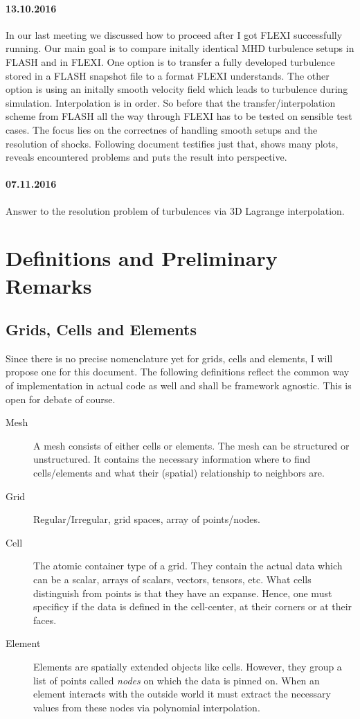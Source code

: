 \paragraph{13.10.2016}
In our last meeting we discussed how to proceed after I got FLEXI successfully
running. Our main goal is to compare initally identical MHD turbulence setups
in FLASH and in FLEXI. One option is to transfer a fully developed turbulence
stored in a FLASH snapshot file to a format FLEXI understands. The other option
is using an initally smooth velocity field which leads to turbulence during
simulation. Interpolation is in order. So before that the
transfer/interpolation scheme from FLASH all the way through FLEXI has to be
tested on sensible test cases. The focus lies on the correctnes of handling
smooth setups and the resolution of shocks. Following document testifies just
that, shows many plots, reveals encountered problems and puts the result into
perspective.

\paragraph{07.11.2016}
Answer to the resolution problem of turbulences via 3D Lagrange interpolation.

\section{Definitions and Preliminary Remarks}

\subsection{Grids, Cells and Elements}
Since there is no precise nomenclature yet for grids, cells and elements, I
will propose one for this document. The following definitions reflect the
common way of implementation in actual code as well and shall be framework
agnostic. This is open for debate of course.

\begin{description}
\item[Mesh] A mesh consists of either cells or elements. The mesh can be
structured or unstructured. It contains the necessary information where to find
cells/elements and what their (spatial) relationship to neighbors are.

\item[Grid] Regular/Irregular, grid spaces, array of points/nodes.

\item[Cell] The atomic container type of a grid. They contain the actual data
which can be a scalar, arrays of scalars, vectors, tensors, etc. What cells
distinguish from points is that they have an expanse. Hence, one must specificy
if the data is defined in the cell-center, at their corners or at their faces.

\item[Element] Elements are spatially extended objects like cells. However,
they group a list of points called \emph{nodes} on which the data is pinned on.
When an element interacts with the outside world it must extract the necessary
values from these nodes via polynomial interpolation.
\end{description}

